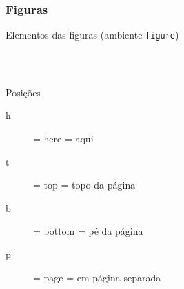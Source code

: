 \begin{frame}
  \frametitle{Figuras}

  \begin{block}{Elementos das figuras (ambiente \texttt{figure})}
    \medskip
%
%
    \\[2mm]
    \texttt{\ \ \\
     \ \ \ \ \\
    \ \ \\
    }
    \medskip
  \end{block}

\begin{block}{Posições}
  \begin{description}
  \item[h] = here = aqui
  \item[t] = top = topo da página
  \item[b] = bottom = pé da página
  \item[p] = page = em página separada
  \end{description}
\end{block}
\end{frame}


